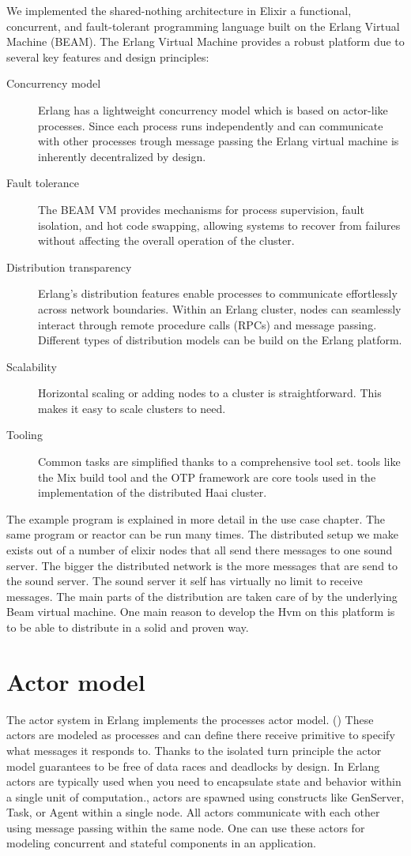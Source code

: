\documentclass[a4paper]{book}
\begin{document}
We implemented the shared-nothing architecture in Elixir a functional, concurrent, and fault-tolerant programming language built on the Erlang Virtual Machine (BEAM). The Erlang Virtual Machine provides a robust platform due to several key features and design principles:
\begin{description}
	\item[Concurrency model] Erlang has a lightweight concurrency model which is based on actor-like processes. Since each process runs independently and can communicate with other processes trough message passing the Erlang virtual machine is inherently decentralized by design.
	\item[Fault tolerance] The BEAM VM provides mechanisms for process supervision, fault isolation, and hot code swapping, allowing systems to recover from failures without affecting the overall operation of the cluster.
	\item[Distribution transparency] Erlang's distribution features enable processes to communicate effortlessly across network boundaries. Within an Erlang cluster, nodes can seamlessly interact through remote procedure calls (RPCs) and message passing. Different types of distribution models can be build on the Erlang platform.
	\item[Scalability] Horizontal scaling or adding nodes to a cluster is straightforward. This makes it easy to scale clusters to need.
	\item[Tooling] Common tasks are simplified thanks to a comprehensive tool set. tools like the Mix build tool and the OTP framework are core tools used in the implementation of the distributed Haai cluster.
\end{description}

The example program is explained in more detail in the use case chapter. The same program or reactor can be run many times. The distributed setup we make exists out of a number of elixir nodes that all send there messages to one sound server. The bigger the distributed network is the more messages that are send to the sound server. The sound server it self has virtually no limit to receive messages. The main parts of the distribution are taken care of by the underlying Beam virtual machine. One main reason to develop the Hvm on this platform is to be able to distribute in a solid and proven way.  

\section{Actor model}
The actor system in Erlang implements the processes actor model. (\cite{de_koster_43_2016}) These actors are modeled as processes and can define there receive primitive to specify what messages it responds to. Thanks to the isolated turn principle the actor model guarantees to be free of data races and deadlocks by design.
In Erlang actors are typically used when you need to encapsulate state and behavior within a single unit of computation., actors are spawned using constructs like GenServer, Task, or Agent within a single node. All actors communicate with each other using message passing within the same node. One can use these actors for modeling concurrent and stateful components in an application.
\end{document}
